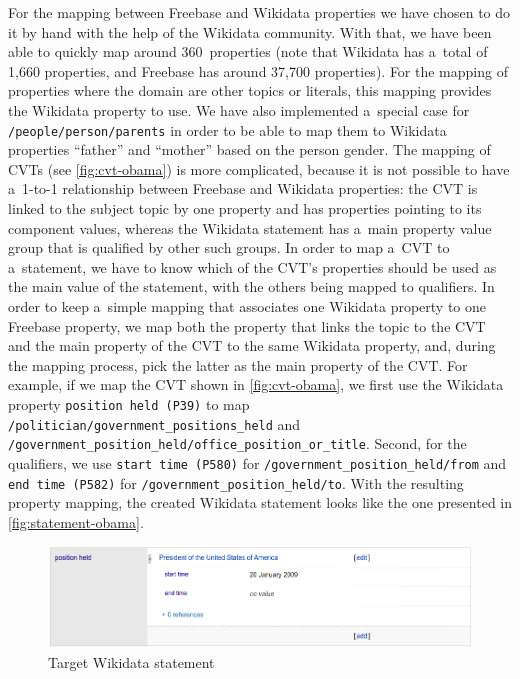\documentclass{sig-alternate}
\begin{document}
For the mapping between Freebase and Wikidata properties we have chosen to do it by hand
with the help of the Wikidata community.
With that, we have been able to quickly map around 360~properties
(note that Wikidata has a~total of 1,660 properties, and Freebase has around 37,700 properties).
For the mapping of properties where the domain are other topics or literals,
this mapping provides the Wikidata property to use.
We have also implemented a~special case for \texttt{/people/person/parents}
in order to be able to map them to Wikidata properties ``father'' and ``mother''
based on the person gender.
The mapping of CVTs (see \autoref{fig:cvt-obama}) is more complicated,
because it is not possible to have a~\mbox{1-to-1} relationship
between Freebase and Wikidata properties: the CVT is linked to the subject topic by one property
and has properties pointing to its component values, whereas the Wikidata statement
has a~main property value group that is qualified by other such groups.
In order to map a~CVT to a~statement, we have to know which of the CVT's properties
should be used as the main value of the statement, with the others being mapped to qualifiers.
In order to keep a~simple mapping that associates one Wikidata property to one Freebase property,
we map both the property that links the topic to the CVT
and the main property of the CVT to the same Wikidata property, and, during the mapping process,
pick the latter as the main property of the CVT.
For example, if we map the CVT shown in \autoref{fig:cvt-obama},
we first use the Wikidata property \texttt{position held (P39)} to map
\texttt{/politician/government\_positions\_held} and
\texttt{/government\_position\_held/office\_position\_or\_title}.
Second, for the qualifiers, we use \texttt{start time (P580)}
for \texttt{/government\_position\_held/from} and \texttt{end time (P582)}
for \texttt{/government\_position\_held/to}.
With the resulting property mapping, the created Wikidata statement
looks like the one presented in \autoref{fig:statement-obama}.

\begin{figure}[!htbp]
\centering
\includegraphics[width=8.45 cm]{img/wikidata-statement-obama.png}
\caption{Target Wikidata statement}
\label{fig:statement-obama}
\end{figure}
\end{document}
